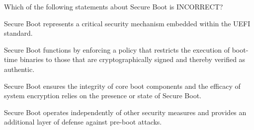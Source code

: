 \documentclass{exam-zh}
\begin{document}
\begin{question}
Which of the following statements about Secure Boot is INCORRECT?
\begin{choices}
\item Secure Boot represents a critical security mechanism embedded within the UEFI standard.

\item Secure Boot functions by enforcing a policy that restricts the execution of boot-time binaries to those that are cryptographically signed and thereby verified as authentic.

\item Secure Boot ensures the integrity of core boot components and the efficacy of system encryption relies on the presence or state of Secure Boot.

\item Secure Boot operates independently of other security measures and provides an additional layer of defense against pre-boot attacks.
\end{choices}
\end{question}
\end{document}

